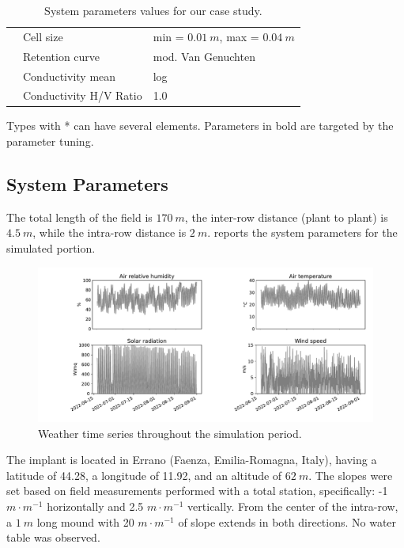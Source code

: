 \begin{table}[H]
\begin{tabular}{p{1.2cm}p{5cm}p{7.5cm}}
		& Cell size  &  min = $0.01~m$, max = $0.04~m$  \\
		& Retention curve & mod. Van Genuchten\\ 
	    & Conductivity mean &  log \\
		& Conductivity H/V Ratio  &  1.0 \\
		\bottomrule
	\end{tabular}%
	\begin{tablenotes}
      \scriptsize
      \item Types with * can have several elements. Parameters in bold are targeted by the parameter tuning.
    \end{tablenotes}
        \caption{System parameters values for our case study.}

	\label{tab:parameter_instances}%
\end{table}%

\subsection{System Parameters}
The total length of the field is $170~m$, the inter-row distance (plant to plant) is $4.5~m$, while the intra-row distance is $2~m$.
 reports the system parameters for the simulated portion.

\begin{figure}[t]
    \centering
    \includegraphics[scale=.45]{chapters/physics-aware/orchard/img/meteo.pdf}
    \caption{Weather time series throughout the simulation period.}
    \label{orchard-fig:meteo}
\end{figure}

The implant is located in Errano (Faenza, Emilia-Romagna, Italy), having a latitude of 44.28, a longitude of 11.92, and an altitude of $62~m$.
The slopes were set based on field measurements performed with a total station, specifically: -1 $m \cdot m^{-1}$ horizontally and 2.5 $m \cdot m^{-1}$ vertically.
From the center of the intra-row, a $1~m$ long mound with 20 $m \cdot m^{-1}$ of slope extends in both directions.
No water table was observed.

